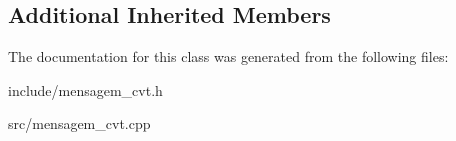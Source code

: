 \subsection*{Additional Inherited Members}


The documentation for this class was generated from the following files\+:\begin{DoxyCompactItemize}
\item 
include/mensagem\+\_\+cvt.\+h\item 
src/mensagem\+\_\+cvt.\+cpp\end{DoxyCompactItemize}
